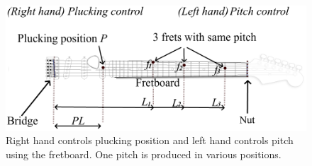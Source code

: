 \documentclass{article}
\begin{document}
\begin{figure}[h!]\
  \centering
  \centerline{\includegraphics[width=.99\columnwidth]{img/fender_drawing7.png}}\vspace{-2mm}
  \caption{Right hand controls plucking position and left hand controls pitch using the fretboard. One pitch is produced in various positions.
  }\label{fig:guitar_overview}\vspace{-2mm}
\end{figure}


%
%
%
%
\vspace{-1.9mm}
\end{document}
